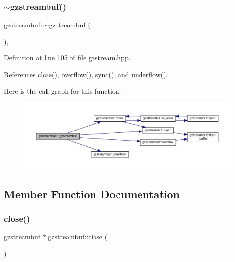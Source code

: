 \subsubsection{\texorpdfstring{$\sim$gzstreambuf()}{~gzstreambuf()}}
{\footnotesize\ttfamily gzstreambuf\+::$\sim$gzstreambuf (\begin{DoxyParamCaption}{ }\end{DoxyParamCaption})\hspace{0.3cm}{\ttfamily [inline]}, {\ttfamily [override]}}



Definition at line 105 of file gzstream.\+hpp.



References close(), overflow(), sync(), and underflow().

Here is the call graph for this function\+:
\nopagebreak
\begin{figure}[H]
\begin{center}
\leavevmode
\includegraphics[width=350pt]{d7/de3/classgzstreambuf_a91aade68db7be79b082ebf291e5802e3_cgraph}
\end{center}
\end{figure}


\subsection{Member Function Documentation}
\mbox{\label{classgzstreambuf_ac47e68029383ac04ded54dedae5c930d}} 
\subsubsection{\texorpdfstring{close()}{close()}}
{\footnotesize\ttfamily \hyperlink{classgzstreambuf}{gzstreambuf} $\ast$ gzstreambuf\+::close (\begin{DoxyParamCaption}{ }\end{DoxyParamCaption})\hspace{0.3cm}{\ttfamily [inline]}}



